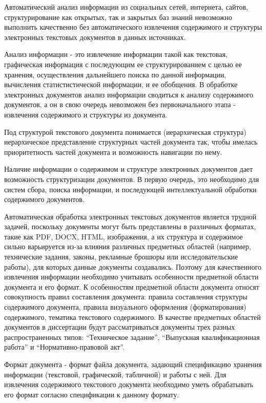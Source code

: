 
{\actuality} 

Автоматический анализ информации из социальных сетей, интернета, сайтов, структурирование как открытых, так и закрытых баз знаний невозможно выполнить качественно без автоматического извлечения содержимого и структуры электронных текстовых документов в данных источниках.

Анализ информации - это извлечение информации такой как текстовая, графическая информация с последующим ее структурированием с целью ее хранения, осуществления дальнейшего поиска по данной информации, вычисления статистистической информации, и ее обобщения. В обработке электронных документов анализ информации сводиться к анализу содержимого документов, а он в свою очередь невозможен без первоначального этапа - извлечения содержимого и структуры из документа.

Под структурой текстового документа понимается (иерархическая структура) иерархическое представление структурных частей документа так, чтобы имелась приоритетность частей документа и возможность навигации по нему.

Наличие информации о содержимом и структуре электронных документов дает возможность структуризации документов. В первую очередь, это необходимо для систем сбора, поиска информации, и последующей интеллектуальной обработки содержимого документов.

Автоматическая обработка электронных текстовых документов является трудной задачей, поскольку документы могут быть представлены в различных форматах, такие как PDF, DOCX, HTML, изображения, а их структура и содержимое сильно варьируется из-за влияния различных предметных областей (например, технические задания, законы, рекламные брошюры или исследовательские работы), для которых данные документы создавались. Поэтому для качественного извлечения информации необходимо учитывать особенности предметной области документа и его формат. К особенностям предметной области документа относят совокупность правил составления документа: правила составления структуры содержимого документа, правила визуального оформления (форматирования) содержимого, тематика текстового содержимого. В качестве предметных областей документов в диссертации будут рассматриваться документы трех разных распространенных типов: “Техническое задание”, “Выпускная квалификационная работа” и “Нормативно-правовой акт”. 

Формат документа - формат файла документа, задающий спецификацию хранения информации (текстовой, графической, табличной) и работы с ней. Для извлечения содержимого текстового документа необходимо уметь обрабатывать его формат согласно спецификации к данному формату.

